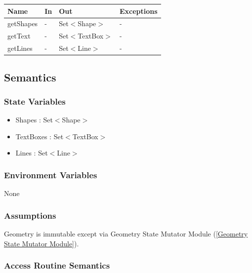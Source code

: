 \documentclass[12pt, titlepage]{article}
\begin{document}
\begin{center}
\begin{tabular}{p{2cm} p{4cm} p{4cm} p{2cm}}
\hline
\textbf{Name} & \textbf{In} & \textbf{Out} & \textbf{Exceptions} \\
\hline
{getShapes} & - & Set$<$Shape$>$ & - \\
\hline
{getText} & - & Set$<$TextBox$>$ & - \\
\hline
{getLines} & - & Set$<$Line$>$ & - \\
\hline
\end{tabular}
\end{center}

\subsection{Semantics}

\subsubsection{State Variables}
\begin{itemize}
\item Shapes : Set$<$Shape$>$
\item TextBoxes : Set$<$TextBox$>$
\item Lines : Set$<$Line$>$
\end{itemize}

\subsubsection{Environment Variables}
%
None
\subsubsection{Assumptions}
Geometry is immutable except via Geometry State Mutator Module (\ref{Geometry State Mutator Module}).

\subsubsection{Access Routine Semantics}
\end{document}
